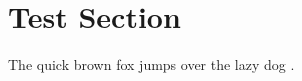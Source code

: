 \documentclass[12pt,a4paper]{report}
\begin{document}
\section{Test Section}
The quick brown fox jumps over the lazy dog \cite{example}.



\end{document}
